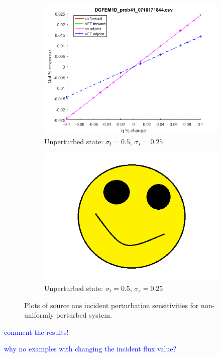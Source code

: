 \documentclass[12pt]{report}
\newcommand{\sigt}{\sigma_t}
\newcommand{\sigs}{\sigma_s}
\newcommand{\comment}[2]{\marginpar{\textcolor{#2}{$\star$}}\textcolor{#2}{#1}\newline}
\newcommand{\jcr}[1]{\comment{#1}{blue}}
\newcommand{\jcr}[1]{\phantom{a}}
\begin{document}
\begin{figure}[H]
\begin{subfigure}{.5\textwidth}
  \includegraphics[width=.98\linewidth]{figures/41qSens.png}
  \caption{Unperturbed state: $\sigt=0.5$, $\sigs=0.25$}
  \label{fig:sfig3}
\end{subfigure}%
\begin{subfigure}{.5\textwidth}
  \centering
  \includegraphics[width=.98\linewidth]{figures/holder.png}
  \caption{Unperturbed state: $\sigt=0.5$, $\sigs=0.25$}
  \label{fig:sfig6}
\end{subfigure}%
\caption{Plots of source ans incident perturbation sensitivities for non-uniformly perturbed system.}
\label{fig:fig}
\end{figure}


\jcr{comment the results!}

\jcr{why no examples with changing the incident flux value?}
\end{document}
